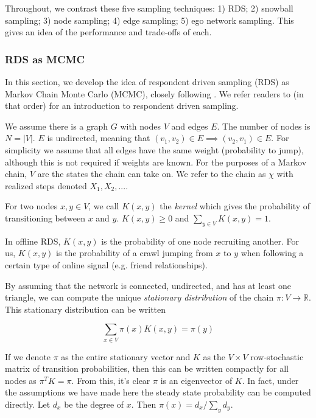 \documentclass[a4paper]{article}
\begin{document}
Throughout, we contrast these five sampling techniques: 1) RDS; 2) snowball sampling; 3) node sampling; 4) edge sampling; 5) ego network sampling. This gives an idea of the performance and trade-offs of each.

\subsubsection{RDS as MCMC}

In this section, we develop the idea of respondent driven sampling (RDS) as Markov Chain Monte Carlo (MCMC), closely following \cite{goel_respondent-driven_2009}. We refer readers to \cite{heckathorn_respondent-driven_2002,salganik_sampling_2004,goel_respondent-driven_2009} (in that order) for an introduction to respondent driven sampling.

We assume there is a graph $G$ with nodes $V$ and edges $E$. The number of nodes is $N = |V|$. $E$ is undirected, meaning that $(v_1, v_2) \in E \implies (v_2, v_1) \in E$. For simplicity we assume that all edges have the same weight (probability to jump), although this is not required if weights are known. For the purposes of a Markov chain, $V$ are the states the chain can take on. We refer to the chain as $\chi$ with realized steps denoted $X_1, X_2, ...$.

For two nodes $x, y \in V$, we call $K(x, y)$ the \emph{kernel} which gives the probability of transitioning between $x$ and $y$. $K(x, y) \ge 0$ and $\sum_{y \in V} K(x, y) = 1$.

In offline RDS, $K(x, y)$ is the probability of one node recruiting another. For us, $K(x, y)$ is the probability of a crawl jumping from $x$ to $y$ when following a certain type of online signal (e.g. friend relationships).

By assuming that the network is connected, undirected, and has at least one triangle, we can compute the unique \emph{stationary distribution} of the chain $\pi: V \to \mathbb{R}$. This stationary distribution can be written

\begin{equation}
\sum_{x \in V} \pi(x) K(x, y) = \pi(y)
\end{equation}

If we denote $\pi$ as the entire stationary vector and $K$ as the $V \times V$ row-stochastic matrix of transition probabilities, then this can be written compactly for all nodes as $\pi^T K = \pi$. From this, it's clear $\pi$ is an eigenvector of $K$. In fact, under the assumptions we have made here the steady state probability can be computed directly. Let $d_x$ be the degree of $x$. Then $\pi(x) = d_x / \sum_y d_y$.
\end{document}
